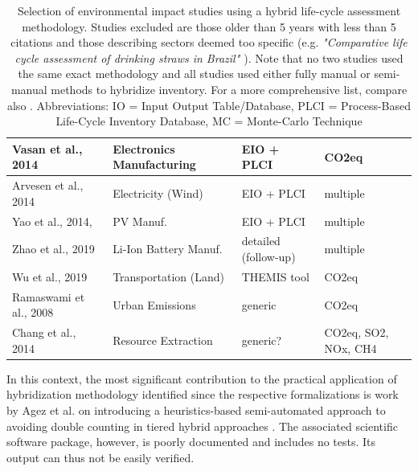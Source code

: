 \documentclass{article}
\begin{document}
\begin{table}[H]
\begin{tabularx}{\textwidth}{| X | X | X | X |}
                \hline
                    Vasan et al., 2014 \cite{vasan_carbon_2014} & Electronics Manufacturing & EIO + PLCI & CO2eq \\
                \hline
                    Arvesen et al., 2014 \cite{arvesen_life_2014} & Electricity (Wind) & EIO + PLCI & multiple \\
                \hline
                    Yao et al., 2014, \cite{yao_hybrid_2014} & PV Manuf. & EIO + PLCI & multiple \\
                \hline
                    Zhao et al., 2019 \cite{zhao_comparative_2019} & Li-Ion Battery Manuf. & detailed (follow-up) & multiple \\
                \hline
                    Wu et al., 2019 \cite{wu_assessing_2019} & Transportation (Land) & THEMIS tool \cite{gibon_methodology_2015} & CO2eq \\
                \hline
                    Ramaswami et al., 2008 \cite{ramaswami_demand-centered_2008} & Urban Emissions & generic & CO2eq \\
                \hline
                    Chang et al., 2014 \cite{chang_shale--well_2014} & Resource Extraction & generic? & CO2eq, SO2, NOx, CH4 \\
                \hline
            \end{tabularx}
            \caption{Selection of environmental impact studies using a hybrid life-cycle assessment methodology. Studies excluded are those older than 5 years with less than 5 citations and those describing sectors deemed too specific (e.g. \textit{"Comparative life cycle assessment of drinking straws in Brazil" \cite{zanghelini_comparative_2020}}). Note that no two studies used the same exact methodology and all studies used either fully manual or semi-manual methods to hybridize inventory. For a more comprehensive list, compare also \cite{crawford_hybrid_2018}. Abbreviations: IO = Input Output Table/Database, PLCI = Process-Based Life-Cycle Inventory Database, MC = Monte-Carlo Technique}
            \label{tab_studies}
        \end{table}
        
        In this context, the most significant contribution to the practical application of hybridization methodology identified since the respective formalizations is work by Agez et al. on introducing a heuristics-based semi-automated approach to avoiding double counting in tiered hybrid approaches \cite{agez_lifting_2019}\cite{agez_hybridization_2020}\cite{agez_correcting_2022}. The associated scientific software package, however, is poorly documented and includes no tests. Its output can thus not be easily verified.
\end{document}
